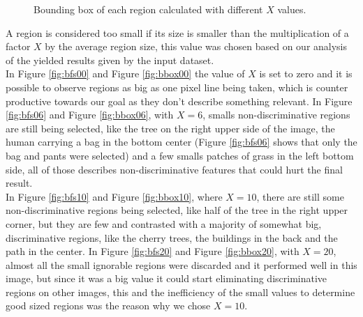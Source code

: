 \documentclass[12pt,a4paper]{article}
\begin{document}
\begin{figure}[!h]
{{		}
		\label{fig:bbox10}
	}
	\quad
	\caption{Bounding box of each region calculated with different $X$ values.}
	\label{fig:bbox}
\end{figure}

A region is considered too small if its size is smaller than the multiplication of a factor $X$ by the average region size, this value was chosen based on our analysis of the yielded results given by the input dataset. \\

In Figure \ref{fig:bfs00} and Figure \ref{fig:bbox00} the value of $X$ is set to zero and it is possible to observe regions as big as one pixel line being taken, which is counter productive towards our goal as they don't describe something relevant. In Figure \ref{fig:bfs06} and Figure \ref{fig:bbox06}, with $X = 6$, smalls non-discriminative regions are still being selected, like the tree on the right upper side of the image, the human carrying a bag in the bottom center (Figure \ref{fig:bfs06} shows that only the bag and pants were selected) and a few smalls patches of grass in the left bottom side, all of those describes non-discriminative features that could hurt the final result. \\

In Figure \ref{fig:bfs10} and Figure \ref{fig:bbox10}, where $X = 10$, there are still some non-discriminative regions being selected, like half of the tree in the right upper corner, but they are few and contrasted with a majority of somewhat big, discriminative regions, like the cherry trees, the buildings in the back and the path in the center. In Figure \ref{fig:bfs20} and Figure \ref{fig:bbox20}, with $X = 20$, almost all the small ignorable regions were discarded and it performed well in this image, but since it was a big value it could start eliminating discriminative regions on other images, this and the inefficiency of the small values to determine good sized regions was the reason why we chose $X = 10$. \\
\end{document}
